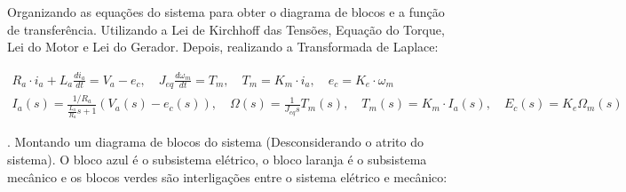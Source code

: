 \documentclass[10pt]{article}
\begin{document}
\quad Organizando as equações do sistema para obter o diagrama de blocos e a função de transferência.
Utilizando a Lei de Kirchhoff das Tensões, Equação do Torque, Lei do Motor e Lei do Gerador. Depois,
realizando a Transformada de Laplace:

\begin{equation}
\begin{aligned}
    R_a \cdot i_a + L_a \frac{di_a}{dt} = V_a - e_c, \quad J_{eq} \frac{d\omega_m}{dt} = T_m, \quad T_m = K_m \cdot i_a, \quad e_c = K_e \cdot \omega_m \\
    I_a(s) = \frac{1/R_a}{\frac{L_a}{R_a}s + 1}(V_a(s) - e_c(s)), \quad \Omega(s) = \frac{1}{J_{eq} s }T_m(s), \quad T_m(s) = K_m \cdot I_a(s), \quad E_c(s) = K_e\Omega_m(s)
\end{aligned}
\end{equation}

. Montando um diagrama de blocos do sistema (Desconsiderando o atrito do sistema).
O bloco azul é o subsistema elétrico, o bloco laranja é o subsistema mecânico e os blocos verdes são interligações entre o sistema elétrico e mecânico:
\end{document}
